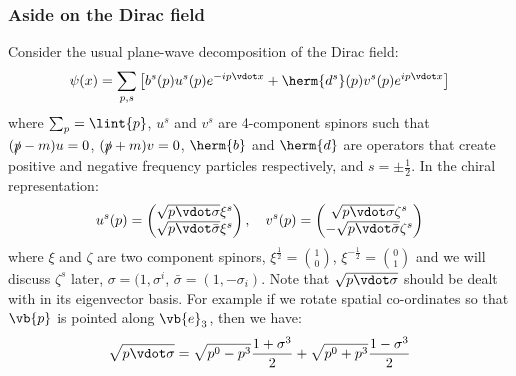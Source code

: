 \documentclass{jknotes}
\begin{document}
\subsubsection{Aside on the Dirac field}
Consider the usual plane-wave decomposition of the Dirac field:
\begin{equation}
    \psi(x) = \sum_{p,s}\left[ b^s(p)u^s(p)e^{-ip\vdot x} + \herm{d^s}(p)v^s(p)e^{ip\vdot x}\right]
\end{equation}
where \(\sum_p = \lint{p}\), \(u^s\) and \(v^s\) are 4-component spinors such that \((\slashed{p}-m)u = 0\), \((\slashed{p}+m)v = 0\), \(\herm{b}\) and \(\herm{d}\) are operators that create positive and negative frequency particles respectively, and \(s = \pm\frac{1}{2}\). In the chiral representation:
\begin{equation}
    u^s(p) = 
    \begin{pmatrix}
        \sqrt{p\vdot\sigma} \xi^s \\ \sqrt{p\vdot\bar{\sigma}} \xi^s
    \end{pmatrix}
    ,\quad
    v^s(p) = 
    \begin{pmatrix}
        \sqrt{p\vdot\sigma} \zeta^s \\ -\sqrt{p\vdot\bar{\sigma}} \zeta^s
    \end{pmatrix}
\end{equation}
where \(\xi\) and \(\zeta\) are two component spinors, \(\xi^{\frac{1}{2}} = {1 \choose 0}\), \(\xi^{-\frac{1}{2}} = {0 \choose 1}\) and we will discuss \(\zeta^s\) later, \(\sigma = (1,\sigma^i\), \(\bar{\sigma} = (1,-\sigma_i)\). Note that \(\sqrt{p\vdot\sigma}\) should be dealt with in its eigenvector basis. For example if we rotate spatial co-ordinates so that \(\vb{p}\) is pointed along \(\vb{e}_3\), then we have:
\begin{equation}
    \sqrt{p\vdot\sigma} = \sqrt{p^0-p^3}\frac{1+\sigma^3}{2} + \sqrt{p^0+p^3}\frac{1-\sigma^3}{2}
\end{equation}
\end{document}
